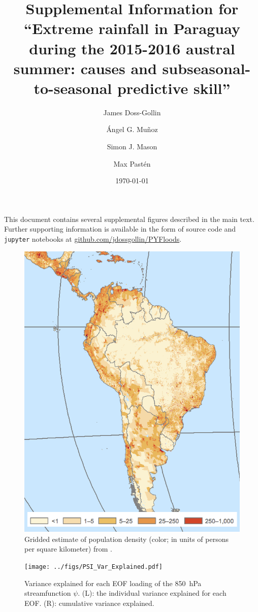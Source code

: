 \documentclass{article}
\title{Supplemental Information for\\``Extreme rainfall in Paraguay during the 2015-2016 austral summer: causes and subseasonal-to-seasonal predictive skill''}
\author{James Doss-Gollin\and \'{A}ngel G. Mu\~{n}oz \and Simon J. Mason \and Max Past\'{e}n}
\date{\today}
\begin{document}
\maketitle

This document contains several supplemental figures described in the main text.
Further supporting information is available in the form of source code and \texttt{jupyter} notebooks at \url{github.com/jdossgollin/PYFloods}.
\listoffigures
\clearpage

\begin{figure}
	\centering
  \includegraphics[width=\textwidth,height=0.9\textheight,keepaspectratio=true]{gpw-v4-2015.png}
	\caption{
		Gridded estimate of population density (color; in units of persons per square kilometer) from \citet{GPWv4}.
	}
\end{figure}

\begin{figure}
  \texttt{[image: ../figs/PSI\_Var\_Explained.pdf]}
	\caption{
		Variance explained for each EOF loading of the \SI{850}{\hecto\pascal} streamfunction $\psi$.
    (L): the individual variance explained for each EOF.
		(R): cumulative variance explained.
	}
\end{figure}
\end{document}
